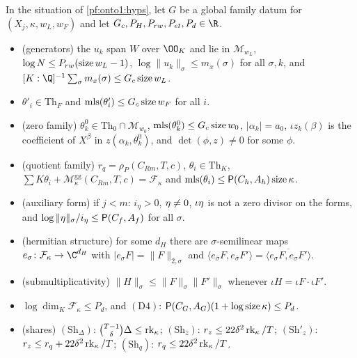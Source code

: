 \begin{definition}\label{pf:onto1:famconds}
In the situation of \cref{pf:onto1:hyps}, let $G$ be a global family datum for $(X_j,\kappa,w_L,w_F)$ and let
$G_c,P_H,P_{rw},P_{et},P_d\in\R$.
\begin{itemize}
\item[$(\mathrm G1)$] (generators) the $u_k$ span $W$ over $\OO_K$ and lie in $\mathcal M_{w_L}$, $\log N\le
P_{rw}(\operatorname{size} w_L-1)$, $\log\|u_k\|_\sigma\le m_x(\sigma)$ for all $\sigma,k$, and $[K:\Q]^{-1}\sum_\sigma m_x(\sigma)\le
G_c\ontoonesize w_L$.
\item[$(\mathrm G2)$] $\theta'_i\in\mathrm{Th}_F$ and $\operatorname{mls}(\theta'_i)\le G_c\operatorname{size} w_F$ for all $i$.
\item[$(\mathrm G3)$] (zero family) $\theta^0_k\in\mathrm{Th}_0\cap\mathcal M_{w_0}$, $\operatorname{mls}(\theta^0_k)\le G_c\operatorname{size} w_0$,
$|\alpha_k|=a_0$, $\iota z_k(\beta)$ is the coefficient of $X^\beta$ in $z(\alpha_k,\theta^0_k)$, and $\det(\phi,z)\ne0$ for
some $\phi$.
\item[$(\mathrm G4)$] (quotient family) $r_q=\rho_P(C_{Rm},T,c)$, $\theta_i\in\mathrm{Th}_K$, $\sum K\theta_i+\mathcal
M^{\mathrm{gg}}_\kappa(C_{Rm},T,c)=\mathcal F_\kappa$ and $\operatorname{mls}(\theta_i)\le\mathsf{P}(C_h,A_h)\operatorname{size}\kappa$.
\item[$(\mathrm G5)$] (auxiliary form) if $j<m$: $i_\eta>0$, $\eta\ne0$, $\iota\eta$ is not a zero divisor on the
forms, and $\log\|\eta\|_\sigma/i_\eta\le\mathsf{P}(C_f,A_f)$ for all $\sigma$.
\item[$(\mathrm D1)$] (hermitian structure) for some $d_H$ there are $\sigma$-semilinear maps $e_\sigma\colon\mathcal F_\kappa\to
\C^{d_H}$ with $|e_\sigma F|=\|F\|_{2,\sigma}$ and $\langle e_{\bar\sigma}F,e_{\bar\sigma}F'\rangle=\overline{\langle e_\sigma
F,e_\sigma F'\rangle}$.
\item[$(\mathrm D2)$] (submultiplicativity) $\|H\|_\sigma\le\|F\|_\sigma\|F'\|_\sigma$ whenever $\iota H=\iota F\cdot\iota F'$.
\item[$(\mathrm D3)$] $\log\dim_K\mathcal F_\kappa\le P_d$, and $(\mathrm D4)$: $\mathsf{P}(C_G,A_G)(1+\log\operatorname{size}\kappa)\le P_d$.
\item[$(\mathrm{Sh})$] (shares) $(\mathrm{Sh}_\Delta)$: $\binom{T-1}\delta\Delta\le\operatorname{rk}_\kappa$; $(\mathrm{Sh}_z)$:
$r_z\le22\delta^2\operatorname{rk}_\kappa/T$; $(\mathrm{Sh}'_z)$: $r_z\le r_q+22\delta^2\operatorname{rk}_\kappa/T$; $(\mathrm{Sh}_q)$:
$r_q\le22\delta^2\operatorname{rk}_\kappa/T$.

\end{itemize}
\end{definition}
